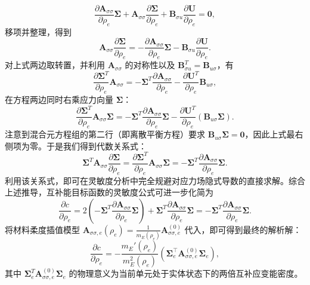 \[
\frac{\partial \boldsymbol{A}_{\sigma\sigma}}{\partial \rho_e} \boldsymbol{\Sigma} + \boldsymbol{A}_{\sigma\sigma} \frac{\partial \boldsymbol{\Sigma}}{\partial \rho_e} + \boldsymbol{B}_{\sigma u} \frac{\partial \boldsymbol{U}}{\partial \rho_e} = \mathbf{0},
\]
移项并整理，得到
\[
\boldsymbol{A}_{\sigma\sigma} \frac{\partial \boldsymbol{\Sigma}}{\partial \rho_e} = - \frac{\partial \boldsymbol{A}_{\sigma\sigma}}{\partial \rho_e} \boldsymbol{\Sigma} - \boldsymbol{B}_{\sigma u} \frac{\partial \boldsymbol{U}}{\partial \rho_e}.
\]
对上式两边取转置，并利用 $\boldsymbol{A}_{\sigma\sigma}$ 的对称性以及 $\boldsymbol{B}_{\sigma u}^T = \boldsymbol{B}_{u\sigma}$，有
\[
\frac{\partial \boldsymbol{\Sigma}^T}{\partial \rho_e} \boldsymbol{A}_{\sigma\sigma} = - \boldsymbol{\Sigma}^T \frac{\partial \boldsymbol{A}_{\sigma\sigma}}{\partial \rho_e} - \frac{\partial \boldsymbol{U}^T}{\partial \rho_e} \boldsymbol{B}_{u\sigma},
\]
在方程两边同时右乘应力向量 $\boldsymbol{\Sigma}$：
\[
\frac{\partial \boldsymbol{\Sigma}^T}{\partial \rho_e} \boldsymbol{A}_{\sigma\sigma} \boldsymbol{\Sigma} = - \boldsymbol{\Sigma}^T \frac{\partial \boldsymbol{A}_{\sigma\sigma}}{\partial \rho_e} \boldsymbol{\Sigma} - \frac{\partial \boldsymbol{U}^T}{\partial \rho_e} \left( \boldsymbol{B}_{u\sigma} \boldsymbol{\Sigma} \right).
\]
注意到混合元方程组的第二行（即离散平衡方程）要求 $\boldsymbol{B}_{u\sigma}\boldsymbol{\Sigma} = \mathbf{0}$，因此上式最右侧项为零。于是我们得到代数关系式：
\[
\boldsymbol{\Sigma}^T \boldsymbol{A}_{\sigma\sigma} \frac{\partial \boldsymbol{\Sigma}}{\partial \rho_e} = \frac{\partial \boldsymbol{\Sigma}^T}{\partial \rho_e} \boldsymbol{A}_{\sigma\sigma} \boldsymbol{\Sigma} = - \boldsymbol{\Sigma}^T \frac{\partial \boldsymbol{A}_{\sigma\sigma}}{\partial \rho_e} \boldsymbol{\Sigma}.
\]
利用该关系式，即可在灵敏度分析中完全规避对应力场隐式导数的直接求解。综合上述推导，互补能目标函数的灵敏度公式可进一步化简为
\[
\frac{\partial c}{\partial \rho_e} = 2 \left( - \boldsymbol{\Sigma}^T \frac{\partial \boldsymbol{A}_{\sigma\sigma}}{\partial \rho_e} \boldsymbol{\Sigma} \right) + \boldsymbol{\Sigma}^T \frac{\partial \boldsymbol{A}_{\sigma\sigma}}{\partial \rho_e} \boldsymbol{\Sigma} = - \boldsymbol{\Sigma}^T \frac{\partial \boldsymbol{A}_{\sigma\sigma}}{\partial \rho_e} \boldsymbol{\Sigma}.
\]
将材料柔度插值模型 $\boldsymbol{A}_{\sigma\sigma, e}(\rho_e) = \frac{1}{m_E(\rho_e)} \boldsymbol{A}_{\sigma\sigma, e}^{(0)}$ 代入，即可得到最终的解析解：
\begin{equation} \label{eq:ch5_hz_compliance_sensitivity}
	\frac{\partial c}{\partial \rho_e} = -\frac{m_E'(\rho_e)}{m_E^2(\rho_e)} \left( \boldsymbol{\Sigma}_e^{\top} \boldsymbol{A}_{\sigma\sigma, e}^{(0)} \boldsymbol{\Sigma}_e \right),
\end{equation}
其中 $\boldsymbol{\Sigma}_e^T \boldsymbol{A}_{\sigma\sigma, e}^{(0)} \boldsymbol{\Sigma}_e$ 的物理意义为当前单元处于实体状态下的两倍互补应变能密度。

